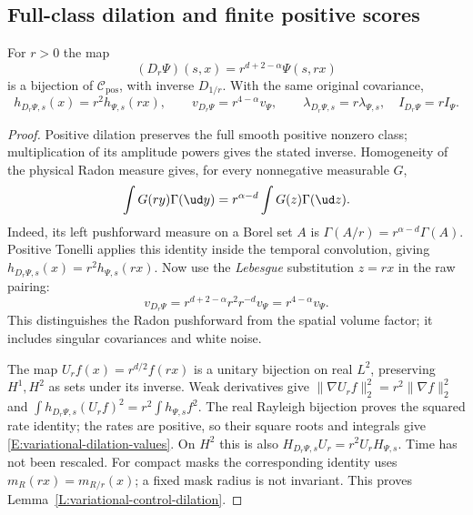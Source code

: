 \subsection{Full-class dilation and finite positive scores}

\begin{lemma}\label{L:variational-control-dilation}
  For $r>0$ the map
  \begin{equation}\label{E:variational-control-dilation}
    (D_r\Psi)(s,x)=r^{d+2-\alpha}\Psi(s,rx)
  \end{equation}
  is a bijection of $\mathcal C_{\mathrm{pos}}$, with inverse $D_{1/r}$.
  With the same original covariance,
  \begin{equation}\label{E:variational-dilation-values}
    h_{D_r\Psi,s}(x)=r^2h_{\Psi,s}(rx),\qquad
    v_{D_r\Psi}=r^{4-\alpha}v_\Psi,\qquad
    \lambda_{D_r\Psi,s}=r\lambda_{\Psi,s},\quad
    I_{D_r\Psi}=rI_\Psi.
  \end{equation}
\end{lemma}

\begin{proof}
  Positive dilation preserves the full smooth positive nonzero class;
  multiplication of its amplitude powers gives the stated inverse.
  Homogeneity of the physical Radon measure gives, for every
  nonnegative measurable $G$,
  \[
    \int G(ry)\Gamma(\ud y)
    =r^{\alpha-d}\int G(z)\Gamma(\ud z).
  \]
  Indeed, its left pushforward measure on a Borel set $A$ is
  $\Gamma(A/r)=r^{\alpha-d}\Gamma(A)$.
  Positive Tonelli applies this identity inside the temporal
  convolution, giving $h_{D_r\Psi,s}(x)=r^2h_{\Psi,s}(rx)$.
  Now use the \emph{Lebesgue} substitution $z=rx$ in the raw pairing:
  \[
    v_{D_r\Psi}=r^{d+2-\alpha}r^2r^{-d}v_\Psi
    =r^{4-\alpha}v_\Psi.
  \]
  This distinguishes the Radon pushforward from the spatial volume
  factor; it includes singular covariances and white noise.

  The map $U_rf(x)=r^{d/2}f(rx)$ is a unitary bijection on real
  $L^2$, preserving $H^1,H^2$ as sets under its inverse.
  Weak derivatives give
  $\|\nabla U_rf\|_2^2=r^2\|\nabla f\|_2^2$ and
  $\int h_{D_r\Psi,s}(U_rf)^2=r^2\int h_{\Psi,s}f^2$.
  The real Rayleigh bijection proves the squared rate identity;
  the rates are positive, so their square roots and integrals give
  \eqref{E:variational-dilation-values}.
  On $H^2$ this is also
  $H_{D_r\Psi,s}U_r=r^2U_rH_{\Psi,s}$.
  Time has not been rescaled. For compact masks the corresponding
  identity uses
  $m_R(rx)=m_{R/r}(x)$; a fixed mask radius is not invariant.
  This proves Lemma~\ref{L:variational-control-dilation}.
\end{proof}

